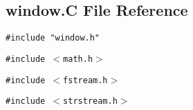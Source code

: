 \subsection{window.C File Reference}
\label{window.C}
{\tt \#include "window.h"}\par
{\tt \#include $<$math.h$>$}\par
{\tt \#include $<$fstream.h$>$}\par
{\tt \#include $<$strstream.h$>$}\par
